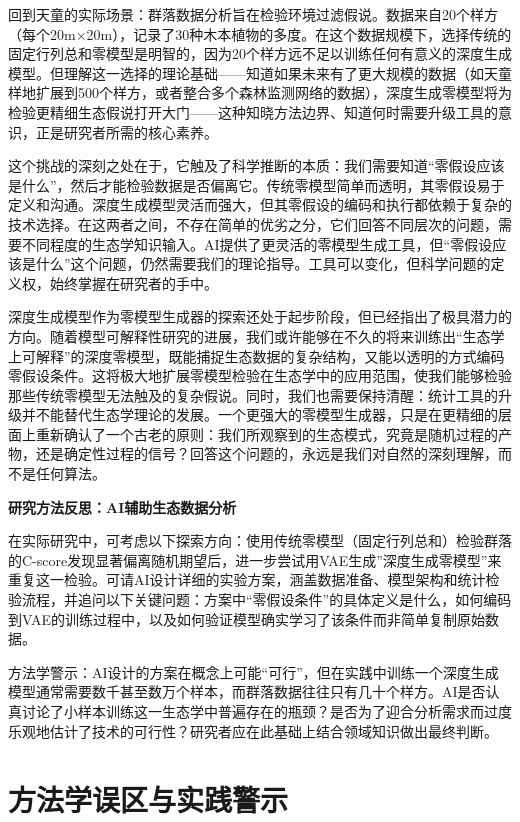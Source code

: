 \documentclass[
  twoside,12pt,fontset=none]{ctexbook}
\renewenvironment{quote}{%
  \def\FrameCommand{{\color{quote-border}\vrule width 4pt}\hspace{10pt}}%
  \MakeFramed {\advance\hsize-\width \FrameRestore\noindent\ignorespaces}%
}{%
  \endMakeFramed
}
\begin{document}
回到天童的实际场景：群落数据分析旨在检验环境过滤假说。数据来自20个样方（每个20m×20m），记录了30种木本植物的多度。在这个数据规模下，选择传统的固定行列总和零模型是明智的，因为20个样方远不足以训练任何有意义的深度生成模型。但理解这一选择的理论基础------知道如果未来有了更大规模的数据（如天童样地扩展到500个样方，或者整合多个森林监测网络的数据），深度生成零模型将为检验更精细生态假说打开大门------这种知晓方法边界、知道何时需要升级工具的意识，正是研究者所需的核心素养。

这个挑战的深刻之处在于，它触及了科学推断的本质：我们需要知道``零假设应该是什么''，然后才能检验数据是否偏离它。传统零模型简单而透明，其零假设易于定义和沟通。深度生成模型灵活而强大，但其零假设的编码和执行都依赖于复杂的技术选择。在这两者之间，不存在简单的优劣之分，它们回答不同层次的问题，需要不同程度的生态学知识输入。AI提供了更灵活的零模型生成工具，但``零假设应该是什么''这个问题，仍然需要我们的理论指导。工具可以变化，但科学问题的定义权，始终掌握在研究者的手中。

深度生成模型作为零模型生成器的探索还处于起步阶段，但已经指出了极具潜力的方向。随着模型可解释性研究的进展，我们或许能够在不久的将来训练出``生态学上可解释''的深度零模型，既能捕捉生态数据的复杂结构，又能以透明的方式编码零假设条件。这将极大地扩展零模型检验在生态学中的应用范围，使我们能够检验那些传统零模型无法触及的复杂假说。同时，我们也需要保持清醒：统计工具的升级并不能替代生态学理论的发展。一个更强大的零模型生成器，只是在更精细的层面上重新确认了一个古老的原则：我们所观察到的生态模式，究竟是随机过程的产物，还是确定性过程的信号？回答这个问题的，永远是我们对自然的深刻理解，而不是任何算法。

\begin{quote}
\textbf{研究方法反思：AI辅助生态数据分析}

在实际研究中，可考虑以下探索方向：使用传统零模型（固定行列总和）检验群落的C-score发现显著偏离随机期望后，进一步尝试用VAE生成''深度生成零模型''来重复这一检验。可请AI设计详细的实验方案，涵盖数据准备、模型架构和统计检验流程，并追问以下关键问题：方案中``零假设条件''的具体定义是什么，如何编码到VAE的训练过程中，以及如何验证模型确实学习了该条件而非简单复制原始数据。

方法学警示：AI设计的方案在概念上可能``可行''，但在实践中训练一个深度生成模型通常需要数千甚至数万个样本，而群落数据往往只有几十个样方。AI是否认真讨论了小样本训练这一生态学中普遍存在的瓶颈？是否为了迎合分析需求而过度乐观地估计了技术的可行性？研究者应在此基础上结合领域知识做出最终判断。
\end{quote}

\hypertarget{ux65b9ux6cd5ux5b66ux8befux533aux4e0eux5b9eux8df5ux8b66ux793a-5}{%
\section{方法学误区与实践警示}\label{ux65b9ux6cd5ux5b66ux8befux533aux4e0eux5b9eux8df5ux8b66ux793a-5}}
\end{document}
